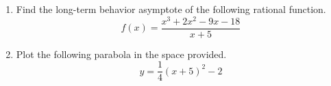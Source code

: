 \documentclass{article}
\begin{document}
\begin{enumerate}
\begin{center}
\CartesianPlane[axes=yes,h=10,w=10]
\end{center} \vspace{1cm}

\newpage

\item Find the long-term behavior asymptote of the following rational function. \[ f(x) = \frac{x^3 + 2x^2 - 9x - 18}{x + 5} \] \vspace{6cm}

\item Plot the following parabola in the space provided. \[ y = \frac{1}{4} \left(x + 5\right)^2 -2 \]

\begin{center}
\CartesianPlane[axes=yes,h=10,w=10]
\end{center} \vspace{1cm}
\end{enumerate}
\end{document}
